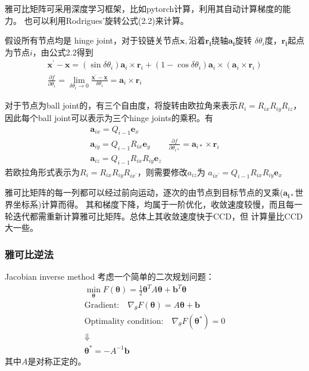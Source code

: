 \documentclass[lang=cn,newtx,10pt,scheme=chinese]{elegantbook}
\begin{document}
雅可比矩阵可采用深度学习框架，比如pytorch计算，利用其自动计算梯度的能力。
也可以利用Rodrigues'旋转公式(2.2)来计算。

假设所有节点均是 hinge joint，对于铰链关节点$\boldsymbol{x}, \text{沿着} \boldsymbol{r_i}$绕轴$\boldsymbol{a_i}$旋转
$\delta\theta_i$度，$\boldsymbol{r_i}$起点为节点$i$，由公式2.2得到
\begin{equation}
  \begin{gathered}
  \boldsymbol{x}^{\prime}-\boldsymbol{x}=\left(\sin \delta \theta_i\right) \boldsymbol{a}_i \times \boldsymbol{r}_i+\left(1-\cos \delta \theta_i\right) \boldsymbol{a}_i \times\left(\boldsymbol{a}_i \times \boldsymbol{r}_i\right) \\
  \frac{\partial f}{\partial \theta_i}=\lim _{\delta \theta_i \rightarrow 0} \frac{\boldsymbol{x}^{\prime}-\boldsymbol{x}}{\delta \theta_i}=\boldsymbol{a}_i \times \boldsymbol{r}_i
  \end{gathered}
\end{equation}

对于节点为ball joint的，有三个自由度，将旋转由欧拉角来表示$R_i = R_{ix}R_{iy}R_{iz}$，
因此每个ball joint可以表示为三个hinge joints的乘积。有
\begin{equation}
  \begin{array}{ll}
  \boldsymbol{a}_{i x}=Q_{i-1} \boldsymbol{e}_x \\
  \boldsymbol{a}_{i y}=Q_{i-1} R_{i x} \boldsymbol{e}_y & \frac{\partial f}{\partial \theta_{i *}}=\boldsymbol{a}_{i *} \times \boldsymbol{r}_i \\
  \boldsymbol{a}_{i z}=Q_{i-1} R_{i x} R_{i y} \boldsymbol{e}_z &
  \end{array}
\end{equation}
若欧拉角形式表示为$R_i = R_{ix}R_{iy}R_{ix^{\prime}}$，则需要修改$a_{iz}$为
${a}_{i x^{\prime}}=Q_{i-1} R_{i x} R_{i y} \boldsymbol{e}_x $

雅可比矩阵的每一列都可以经过前向运动，逐次的由节点到目标节点的叉乘($\boldsymbol{a_{i*}}$世界坐标系)计算而得。
其和梯度下降，均属于一阶优化，收敛速度较慢，而且每一轮迭代都需重新计算雅可比矩阵。总体上其收敛速度快于CCD，但
计算量比CCD大一些。

\subsubsection{雅可比逆法}
Jacobian inverse method
考虑一个简单的二次规划问题：
\begin{gather*}
  \min _{\boldsymbol{\theta}} F(\boldsymbol{\theta})=\frac{1}{2} \boldsymbol{\theta}^T A \boldsymbol{\theta}+\boldsymbol{b}^T \boldsymbol{\theta} \\
  \text {Gradient:} \quad \nabla_\theta F(\boldsymbol{\theta})=A \boldsymbol{\theta}+\boldsymbol{b}\\
  \text {Optimality condition:} \quad \nabla_\theta F\left(\boldsymbol{\theta}^*\right)=0  \tag{3.*}\\
  \Downarrow  \\ 
  \boldsymbol{\theta}^*=-A^{-1} \boldsymbol{b}
\end{gather*}
其中$A$是对称正定的。
\end{document}
